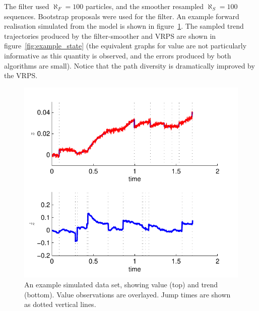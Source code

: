\documentclass[10pt,twocolumn,twoside]{IEEEtran}
\begin{document}
The filter used $\aleph_F = 100$ particles, and the smoother resampled $\aleph_S = 100$ sequences. Bootstrap proposals were used for the filter. An example forward realisation simulated from the model is shown in figure~\ref{fig:example_data}. The sampled trend trajectories produced by the filter-smoother and VRPS are shown in figure~\ref{fig:example_state} (the equivalent graphs for value are not particularly informative as this quantity is observed, and the errors produced by both algorithms are small). Notice that the path diversity is dramatically improved by the VRPS.
%
\begin{figure}[!t]
\centering
\includegraphics[width=0.9\columnwidth]{example_data.pdf}
\caption{An example simulated data set, showing value (top) and trend (bottom). Value observations are overlayed. Jump times are shown as dotted vertical lines.}
\label{fig:example_data}
\end{figure}
%
\end{document}
